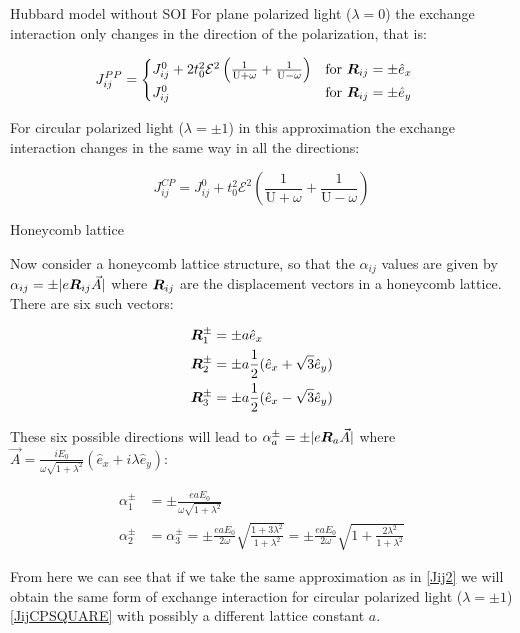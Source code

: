 \begin{section}{Hubbard model without SOI}
For plane polarized light ($\lambda = 0$) the exchange interaction only changes in the direction of the polarization, that is:

\begin{equation}
J_{ij}^{PP} = \begin{cases}
		J_{ij}^0 + 2t_0^2 \mathcal{E}^2 \left( \frac{1}{\text{U}+\omega} + \frac{1}{\text{U}-\omega} \right) & \text{for } \boldsymbol{R}_{ij} = \pm \hat{e}_x \\
J_{ij}^0 & \text{for } \boldsymbol{R}_{ij} = \pm \hat{e}_y
\end{cases} \quad 
\end{equation}

For circular polarized light ($\lambda=\pm1$) in this approximation the exchange interaction changes in the same way in all the directions:

\begin{equation}
\label{JijCPSQUARE}
J_{ij}^{CP} = J_{ij}^0 + t_0^2 \mathcal{E}^2 \left( \frac{1}{\text{U}+\omega} + \frac{1}{\text{U}-\omega} \right)
\end{equation}

\begin{subsection}{Honeycomb lattice}

Now consider a honeycomb lattice structure, so that the $\alpha_{ij}$ values are given by $\alpha_{ij} = \pm|e\boldsymbol{R}_{ij}\vec{A}|$ where $\boldsymbol{R}_{ij}$ are the displacement vectors in a honeycomb lattice. There are six such vectors:

\begin{align}
\boldsymbol{R}_1^\pm &= \pm a\hat{e}_x \\
\boldsymbol{R}_2^\pm &= \pm a\frac{1}{2}(\hat{e}_x + \sqrt{3}\hat{e}_y) \\
\boldsymbol{R}_3^\pm &= \pm a\frac{1}{2}(\hat{e}_x - \sqrt{3}\hat{e}_y)
\end{align}

These six possible directions will lead to $\alpha_a^\pm = \pm |e\boldsymbol{R}_a\vec{A}|$ where $\vec{A}=\frac{iE_0}{\omega\sqrt{1+\lambda^2}}(\hat{e}_x+i\lambda\hat{e}_y)$:

\begin{align}
\alpha_1^\pm &= \pm \frac{eaE_0}{\omega\sqrt{1+\lambda^2}} \\
\alpha_2^\pm &= \alpha_3^\pm = \pm \frac{eaE_0}{2\omega} \sqrt{\frac{1+3\lambda^2}{1+\lambda^2}} = \pm\frac{eaE_0}{2\omega}\sqrt{1+\frac{2\lambda^2}{1+\lambda^2}}
\end{align}

From here we can see that if we take the same approximation as in \ref{Jij2} we will obtain the same form of exchange interaction for circular polarized light ($\lambda=\pm1$) \ref{JijCPSQUARE} with possibly a different lattice constant $a$. 


\end{subsection}
\end{section}
